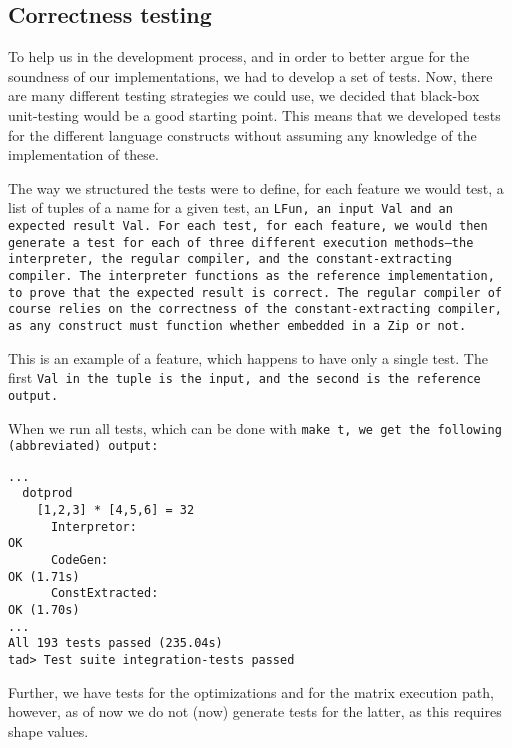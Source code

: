 \subsection{Correctness testing}\label{correctness}
To help us in the development process, and in order to better argue for the
soundness of our implementations, we had to develop a set of tests. Now, there
are many different testing strategies we could use, we decided that black-box
unit-testing would be a good starting point. This means that we developed
tests for the different language constructs without assuming any knowledge
of the implementation of these.

The way we structured the tests were to define, for each feature we would test,
a list of tuples of a name for a given test, an \tt{LFun}, an input \tt{Val}
and an expected result \tt{Val}. For each test, for each feature, we would then
generate a test for each of three different execution methods---the interpreter,
the regular compiler, and the constant-extracting compiler. The interpreter
functions as the reference implementation, to prove that the expected result
is correct. The regular compiler of course relies on the correctness of the
constant-extracting compiler, as any construct must function whether embedded
in a \tt{Zip} or not.


This is an example of a feature, which happens to have only a single test. The
first \tt{Val} in the tuple is the input, and the second is the reference output.

When we run all tests, which can be done with \tt{make t}, we get the following
(abbreviated) output:

\begin{verbatim}
...
  dotprod
    [1,2,3] * [4,5,6] = 32
      Interpretor:                                                        OK
      CodeGen:                                                            OK (1.71s)
      ConstExtracted:                                                     OK (1.70s)
...
All 193 tests passed (235.04s)
tad> Test suite integration-tests passed
\end{verbatim}

Further, we have tests for the optimizations and for the matrix execution path,
however, as of now we do not (now) generate tests for the latter, as this requires
shape values.
